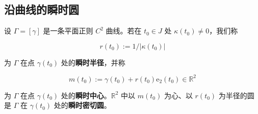 \subsection*{沿曲线的瞬时圆}

设 $ \Gamma = [\gamma] $ 是一条平面正则 $ C^{2} $ 曲线。若在 $ t_{0} \in J $ 处 $ \kappa(t_{0}) \ne 0 $，我们称

\[
r(t_{0}) := 1/|\kappa(t_{0})|
\]

为 $ \Gamma $ 在点 $ \gamma(t_{0}) $ 处的\textbf{瞬时半径}，并称

\[
m(t_{0}) := \gamma(t_{0}) + r(t_{0})\mathrm{e}_{2}(t_{0}) \in \mathbb{R}^{2}
\]

为 $ \Gamma $ 在点 $ \gamma(t_{0}) $ 处的\textbf{瞬时中心}。$ \mathbb{R}^{2} $ 中以 $ m(t_{0}) $ 为心、以 $ r(t_{0}) $ 为半径的圆是 $ \Gamma $ 在 $ \gamma(t_{0}) $ 处的\textbf{瞬时密切圆}。


